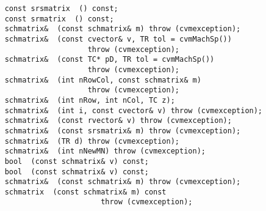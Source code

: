 \verb"    const srsmatrix "\verb" () const;"\\
\verb"    const srmatrix "\verb" () const;"\\
\verb"    schmatrix& "\verb" (const schmatrix& m) throw (cvmexception);"\\
\verb"    schmatrix& "\verb" (const cvector& v, TR tol = cvmMachSp())"\\
\verb"                       throw (cvmexception);"\\
\verb"    schmatrix& "\verb" (const TC* pD, TR tol = cvmMachSp())"\\
\verb"                       throw (cvmexception);"\\
\verb"    schmatrix& "\verb" (int nRowCol, const schmatrix& m)"\\
\verb"                       throw (cvmexception);"\\
\verb"    schmatrix& "\verb" (int nRow, int nCol, TC z);"\\
\verb"    schmatrix& "\verb" (int i, const cvector& v) throw (cvmexception);"\\
\verb"    schmatrix& "\verb" (const rvector& v) throw (cvmexception);"\\
\verb"    schmatrix& "\verb" (const srsmatrix& m) throw (cvmexception);"\\
\verb"    schmatrix& "\verb" (TR d) throw (cvmexception);"\\
\verb"    schmatrix& "\verb" (int nNewMN) throw (cvmexception);"\\
\verb"    bool "\verb" (const schmatrix& v) const;"\\
\verb"    bool "\verb" (const schmatrix& v) const;"\\
\verb"    schmatrix& "\verb" (const schmatrix& m) throw (cvmexception);"\\
\verb"    schmatrix "\verb" (const schmatrix& m) const"\\
\verb"                          throw (cvmexception);"\\
